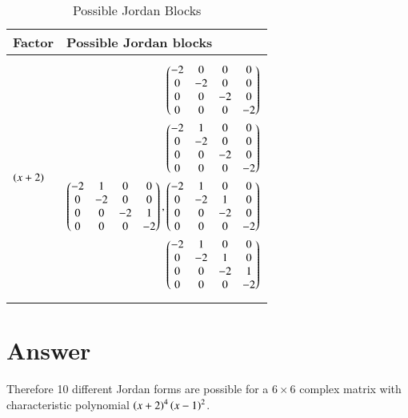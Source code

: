 \documentclass[journal,12pt,twocolumn]{IEEEtran}
\numberwithin{table}{section}
\begin{document}
\begin{table*}[ht!]
\begin{center}
\begin{tabular}{|l|l|}
\hline
\textbf{Factor} & \textbf{Possible Jordan blocks} \\[0.5ex]
\hline
 $\left(x+2\right)$ & \parbox{10cm}{\begin{align}
\begin{pmatrix}-2&0&0&0\\0&-2&0&0\\0&0&-2&0\\0&0&0&-2\end{pmatrix}\\
\begin{pmatrix}-2&1&0&0\\0&-2&0&0\\0&0&-2&0\\0&0&0&-2\end{pmatrix}\\
\begin{pmatrix}-2&1&0&0\\0&-2&0&0\\0&0&-2&1\\0&0&0&-2\end{pmatrix},\begin{pmatrix}-2&1&0&0\\0&-2&1&0\\0&0&-2&0\\0&0&0&-2\end{pmatrix}\\
\begin{pmatrix}-2&1&0&0\\0&-2&1&0\\0&0&-2&1\\0&0&0&-2\end{pmatrix}
\end{align}}
\\ [0.5ex] 
\hline
$\brak{x-1}$ & \parbox{10cm}{\begin{align}
\myvec{1&0\\0&1}\\\myvec{1&1\\0&1}
\end{align}}
\\ [0.5ex] 
\hline
\end{tabular}
\caption{Possible Jordan Blocks}
\label{table:1}
\end{center}
\vspace{-0.5cm}
\end{table*}
\section{Answer}
Therefore 10 different Jordan forms are possible for a $6\times6$ complex matrix with characteristic polynomial $\left(x+2\right)^4\left(x-1\right)^2$.
\end{document}
